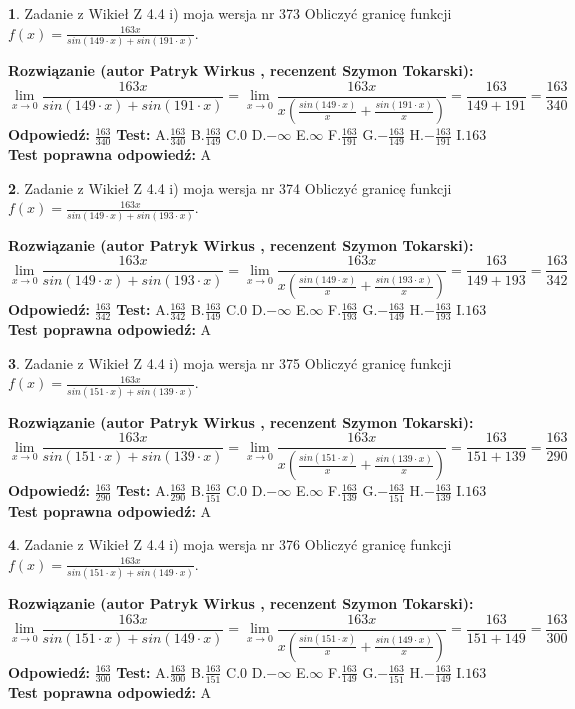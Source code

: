 \documentclass[12pt, a4paper]{article}
\theoremstyle{definition} %
\newtheorem{zad}{}
\newcommand{\zadStart}[1]{\begin{zad}#1\newline}
\newcommand{\zadStop}{\end{zad}}
\newcommand{\rozwStart}[2]{\noindent \textbf{Rozwiązanie (autor #1 , recenzent #2): }\newline}
\newcommand{\rozwStop}{\newline}
\newcommand{\odpStart}{\noindent \textbf{Odpowiedź:}\newline}
\newcommand{\odpStop}{\newline}
\newcommand{\testStart}{\noindent \textbf{Test:}\newline}
\newcommand{\testStop}{\newline}
\newcommand{\kluczStart}{\noindent \textbf{Test poprawna odpowiedź:}\newline}
\newcommand{\kluczStop}{\newline}
\begin{document}
\zadStart{Zadanie z Wikieł Z 4.4 i) moja wersja nr 373}
Obliczyć granicę funkcji $f(x)=\frac{163x}{sin(149\cdot x) +sin(191\cdot x)}$.
\zadStop
\rozwStart{Patryk Wirkus}{Szymon Tokarski}
$$\lim\limits_{x\to 0}\frac{163x}{sin(149\cdot x) +sin(191\cdot x)}=\lim\limits_{x\to 0}\frac{163x}{x(\frac{sin(149\cdot x)}{x}+\frac{sin(191\cdot x)}{x})}=\frac{163}{149+191} = \frac{163}{340}$$
\rozwStop
\odpStart
$\frac{163}{340}$
\odpStop
\testStart
A.$\frac{163}{340}$
B.$\frac{163}{149}$
C.$0$
D.$-\infty$
E.$\infty$
F.$\frac{163}{191}$
G.$-\frac{163}{149}$
H.$-\frac{163}{191}$
I.$163$
\testStop
\kluczStart
A
\kluczStop



\zadStart{Zadanie z Wikieł Z 4.4 i) moja wersja nr 374}
Obliczyć granicę funkcji $f(x)=\frac{163x}{sin(149\cdot x) +sin(193\cdot x)}$.
\zadStop
\rozwStart{Patryk Wirkus}{Szymon Tokarski}
$$\lim\limits_{x\to 0}\frac{163x}{sin(149\cdot x) +sin(193\cdot x)}=\lim\limits_{x\to 0}\frac{163x}{x(\frac{sin(149\cdot x)}{x}+\frac{sin(193\cdot x)}{x})}=\frac{163}{149+193} = \frac{163}{342}$$
\rozwStop
\odpStart
$\frac{163}{342}$
\odpStop
\testStart
A.$\frac{163}{342}$
B.$\frac{163}{149}$
C.$0$
D.$-\infty$
E.$\infty$
F.$\frac{163}{193}$
G.$-\frac{163}{149}$
H.$-\frac{163}{193}$
I.$163$
\testStop
\kluczStart
A
\kluczStop



\zadStart{Zadanie z Wikieł Z 4.4 i) moja wersja nr 375}
Obliczyć granicę funkcji $f(x)=\frac{163x}{sin(151\cdot x) +sin(139\cdot x)}$.
\zadStop
\rozwStart{Patryk Wirkus}{Szymon Tokarski}
$$\lim\limits_{x\to 0}\frac{163x}{sin(151\cdot x) +sin(139\cdot x)}=\lim\limits_{x\to 0}\frac{163x}{x(\frac{sin(151\cdot x)}{x}+\frac{sin(139\cdot x)}{x})}=\frac{163}{151+139} = \frac{163}{290}$$
\rozwStop
\odpStart
$\frac{163}{290}$
\odpStop
\testStart
A.$\frac{163}{290}$
B.$\frac{163}{151}$
C.$0$
D.$-\infty$
E.$\infty$
F.$\frac{163}{139}$
G.$-\frac{163}{151}$
H.$-\frac{163}{139}$
I.$163$
\testStop
\kluczStart
A
\kluczStop



\zadStart{Zadanie z Wikieł Z 4.4 i) moja wersja nr 376}
Obliczyć granicę funkcji $f(x)=\frac{163x}{sin(151\cdot x) +sin(149\cdot x)}$.
\zadStop
\rozwStart{Patryk Wirkus}{Szymon Tokarski}
$$\lim\limits_{x\to 0}\frac{163x}{sin(151\cdot x) +sin(149\cdot x)}=\lim\limits_{x\to 0}\frac{163x}{x(\frac{sin(151\cdot x)}{x}+\frac{sin(149\cdot x)}{x})}=\frac{163}{151+149} = \frac{163}{300}$$
\rozwStop
\odpStart
$\frac{163}{300}$
\odpStop
\testStart
A.$\frac{163}{300}$
B.$\frac{163}{151}$
C.$0$
D.$-\infty$
E.$\infty$
F.$\frac{163}{149}$
G.$-\frac{163}{151}$
H.$-\frac{163}{149}$
I.$163$
\testStop
\kluczStart
A
\kluczStop
\end{document}

